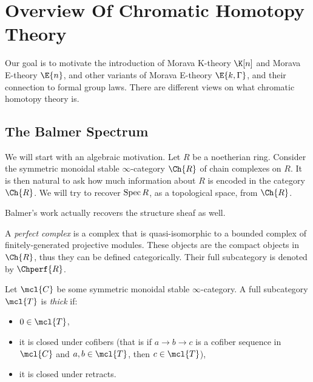 \section{Overview Of Chromatic Homotopy Theory}

Our goal is to motivate the introduction of Morava K-theory $\K[n]$ and Morava E-theory $\E{n}$, and other variants of Morava E-theory $\E{k,\Gamma}$, and their connection to formal group laws.
There are different views on what chromatic homotopy theory is.



\subsection{The Balmer Spectrum}

We will start with an algebraic motivation.
Let $R$ be a noetherian ring.
Consider the symmetric monoidal stable $\infty$-category $\Ch{R}$ of chain complexes on $R$. 
It is then natural to ask how much information about $R$ is encoded in the category $\Ch{R}$.
We will try to recover $\operatorname{Spec}{R}$, as a topological space, from $\Ch{R}$.

\begin{remark*}
	Balmer's work actually recovers the structure sheaf as well. 
\end{remark*}

\begin{definition}
	A \emph{perfect complex} is a complex that is quasi-isomorphic to a bounded complex of finitely-generated projective modules.
	These objects are the compact objects in $\Ch{R}$, thus they can be defined categorically.
	Their full subcategory is denoted by $\Chperf{R}$.
\end{definition}

\begin{definition}
	Let $\mcl{C}$ be some symmetric monoidal stable $\infty$-category.
	A full subcategory $\mcl{T}$ is \emph{thick} if:
	\begin{itemize}
		\item $0 \in \mcl{T}$,
		\item it is closed under cofibers (that is if $a \to b \to c$ is a cofiber sequence in $\mcl{C}$ and $a, b \in \mcl{T}$, then $c \in \mcl{T}$),
		\item it is closed under retracts.
	\end{itemize}
\end{definition}


